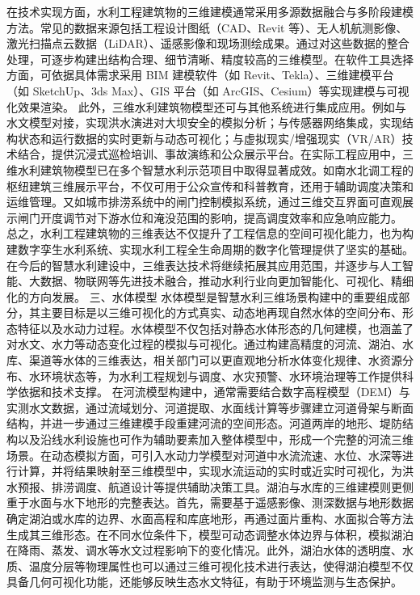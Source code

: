 {{在技术实现方面，水利工程建筑物的三维建模通常采用多源数据融合与多阶段建模方法。常见的数据来源包括工程设计图纸（CAD、Revit
等）、无人机航测影像、激光扫描点云数据（LiDAR）、遥感影像和现场测绘成果。通过对这些数据的整合处理，可逐步构建出结构合理、细节清晰、精度较高的三维模型。在软件工具选择方面，可依据具体需求采用 BIM 建模软件（如
Revit、Tekla）、三维建模平台（如 SketchUp、3ds Max）、GIS 平台（如 ArcGIS、Cesium）等实现建模与可视化效果渲染。
此外，三维水利建筑物模型还可与其他系统进行集成应用。例如与水文模型对接，实现洪水演进对大坝安全的模拟分析；与传感器网络集成，实现结构状态和运行数据的实时更新与动态可视化；与虚拟现实/增强现实（VR/AR）技术结合，提供沉浸式巡检培训、事故演练和公众展示平台。在实际工程应用中，三维水利建筑物模型已在多个智慧水利示范项目中取得显著成效。如南水北调工程的枢纽建筑三维展示平台，不仅可用于公众宣传和科普教育，还用于辅助调度决策和运维管理。又如城市排涝系统中的闸门控制模拟系统，通过三维交互界面可直观展示闸门开度调节对下游水位和淹没范围的影响，提高调度效率和应急响应能力。
总之，水利工程建筑物的三维表达不仅提升了工程信息的空间可视化能力，也为构建数字孪生水利系统、实现水利工程全生命周期的数字化管理提供了坚实的基础。在今后的智慧水利建设中，三维表达技术将继续拓展其应用范围，并逐步与人工智能、大数据、物联网等先进技术融合，推动水利行业向更加智能化、可视化、精细化的方向发展。
三、水体模型
水体模型是智慧水利三维场景构建中的重要组成部分，其主要目标是以三维可视化的方式真实、动态地再现自然水体的空间分布、形态特征以及水动力过程。水体模型不仅包括对静态水体形态的几何建模，也涵盖了对水文、水力等动态变化过程的模拟与可视化。通过构建高精度的河流、湖泊、水库、渠道等水体的三维表达，相关部门可以更直观地分析水体变化规律、水资源分布、水环境状态等，为水利工程规划与调度、水灾预警、水环境治理等工作提供科学依据和技术支撑。
在河流模型构建中，通常需要结合数字高程模型（DEM）与实测水文数据，通过流域划分、河道提取、水面线计算等步骤建立河道骨架与断面结构，并进一步通过三维建模手段重建河流的空间形态。河道两岸的地形、堤防结构以及沿线水利设施也可作为辅助要素加入整体模型中，形成一个完整的河流三维场景。在动态模拟方面，可引入水动力学模型对河道中水流流速、水位、水深等进行计算，并将结果映射至三维模型中，实现水流运动的实时或近实时可视化，为洪水预报、排涝调度、航道设计等提供辅助决策工具。湖泊与水库的三维建模则更侧重于水面与水下地形的完整表达。首先，需要基于遥感影像、测深数据与地形数据确定湖泊或水库的边界、水面高程和库底地形，再通过面片重构、水面拟合等方法生成其三维形态。在不同水位条件下，模型可动态调整水体边界与体积，模拟湖泊在降雨、蒸发、调水等水文过程影响下的变化情况。此外，湖泊水体的透明度、水质、温度分层等物理属性也可以通过三维可视化技术进行表达，使得湖泊模型不仅具备几何可视化功能，还能够反映生态水文特征，有助于环境监测与生态保护。
}}
